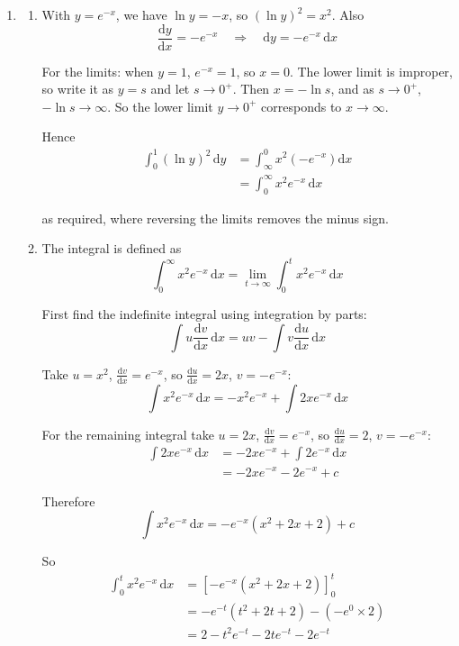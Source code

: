 \documentclass[leqno]{article}
\begin{document}
\begin{enumerate}[
  label=\textbf{\arabic*.},
  leftmargin=*,
  topsep=0pt,
  partopsep=0pt,
  parsep=0pt
]
\begin{djsSolution}
\begin{enumerate}[label=\textbf{(\alph*)}, start=1]
  \item
  \begin{enumerate}[label=(\roman*), start=1]
    \item With \(y=e^{-x}\), we have \(\ln y=-x\), so \((\ln y)^2=x^2\). Also
\[
\frac{\mathrm{d}y}{\mathrm{d}x}=-e^{-x}\quad\Longrightarrow\quad \mathrm{d}y=-e^{-x}\,\mathrm{d}x
\]

For the limits: when \(y=1\), \(e^{-x}=1\), so \(x=0\). The lower limit is improper, so write it as \(y=s\) and let \(s\to 0^{+}\). Then \(x=-\ln s\), and as \(s \to 0^{+}\), \(-\ln s \to \infty\). So the lower limit \(y \to 0^{+}\) corresponds to \(x \to \infty\).

Hence
\begin{align*}
\int_{0}^{1} (\ln y)^2\,\mathrm{d}y &= \int_{\infty}^{0} x^2\left(-e^{-x}\right)\mathrm{d}x\\
&= \int_{0}^{\infty} x^2 e^{-x}\,\mathrm{d}x
\end{align*}

as required, where reversing the limits removes the minus sign.

    \item The integral is defined as
\[
\int_{0}^{\infty} x^2 e^{-x}\,\mathrm{d}x=\lim_{t\to\infty}\int_{0}^{t} x^2 e^{-x}\,\mathrm{d}x
\]

First find the indefinite integral using integration by parts:
\[
\int u\frac{\mathrm{d}v}{\mathrm{d}x}\,\mathrm{d}x = uv - \int v\frac{\mathrm{d}u}{\mathrm{d}x}\,\mathrm{d}x
\]

Take \(u=x^2\), \(\frac{\mathrm{d}v}{\mathrm{d}x}=e^{-x}\), so \(\frac{\mathrm{d}u}{\mathrm{d}x}=2x\), \(v=-e^{-x}\):
\[
\int x^2e^{-x}\,\mathrm{d}x=-x^2e^{-x}+\int 2xe^{-x}\,\mathrm{d}x
\]

For the remaining integral take \(u=2x\), \(\frac{\mathrm{d}v}{\mathrm{d}x}=e^{-x}\), so \(\frac{\mathrm{d}u}{\mathrm{d}x}=2\), \(v=-e^{-x}\):
\begin{align*}
\int 2xe^{-x}\,\mathrm{d}x&=-2xe^{-x}+\int 2e^{-x}\,\mathrm{d}x\\
&=-2xe^{-x}-2e^{-x}+c
\end{align*}

Therefore
\[
\int x^2e^{-x}\,\mathrm{d}x=-e^{-x}\left(x^2+2x+2\right)+c
\]

So
\begin{align*}
\int_{0}^{t} x^2 e^{-x}\,\mathrm{d}x&=\left[-e^{-x}\left(x^2+2x+2\right)\right]_{0}^{t}\\
&=-e^{-t}\left(t^2+2t+2\right)-\left(-e^{0}\times 2\right)\\
&=2-t^2e^{-t}-2te^{-t}-2e^{-t}
\end{align*}


\end{enumerate}
\end{enumerate}
\end{djsSolution}
\end{enumerate}
\end{document}
